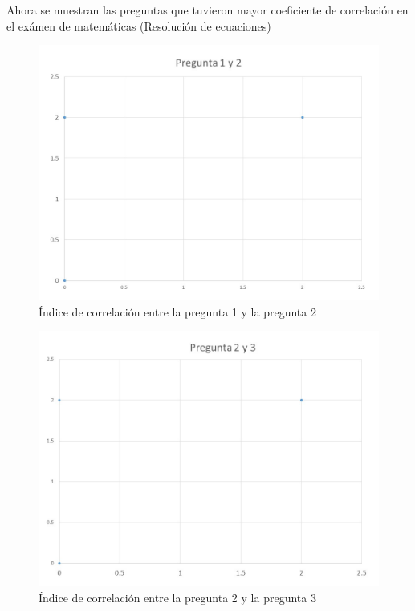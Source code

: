 \documentclass[12pt] {report}
\begin{document}
Ahora se muestran las preguntas que tuvieron mayor coeficiente de correlación en el exámen de matemáticas (Resolución de ecuaciones)

\begin{figure}[H]
\centering 
\includegraphics[scale=.4]{MCorrelacionmax12.JPG}
\caption{Índice de correlación entre la pregunta 1 y la pregunta 2}
\end{figure}

\begin{figure}[H]
\centering 
\includegraphics[scale=.4]{MCorrelacionmax23.JPG}
\caption{Índice de correlación entre la pregunta 2 y la pregunta 3}
\end{figure}
\end{document}
